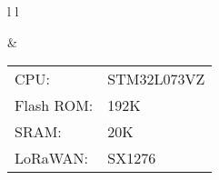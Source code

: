 \pagebreak
{}

\begin{tabular}{l l}

\mbox{}

&

\bigskip
\begin{tabular}{l l}
CPU:&STM32L073VZ \\
Flash ROM:&192K\\
SRAM:&20K\\
\hline
LoRaWAN:&SX1276\\
\end{tabular}

\\

\end{tabular}



